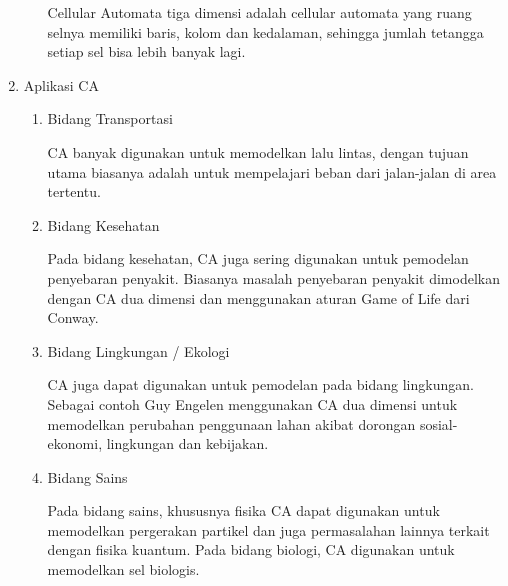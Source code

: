 \begin{enumerate}
\begin{enumerate}
			Cellular Automata tiga dimensi adalah cellular automata yang ruang selnya memiliki baris, kolom dan kedalaman, sehingga jumlah tetangga setiap sel bisa lebih banyak lagi.
		\end{enumerate}
		
	\item Aplikasi CA
		
		\begin{enumerate}
			\item Bidang Transportasi
			
			CA banyak digunakan untuk memodelkan lalu lintas, dengan tujuan utama biasanya adalah untuk mempelajari beban dari jalan-jalan di area tertentu.
			
			\item Bidang Kesehatan
			
			Pada bidang kesehatan, CA juga sering digunakan untuk pemodelan penyebaran penyakit. Biasanya masalah penyebaran penyakit dimodelkan dengan CA dua dimensi dan menggunakan aturan Game of Life dari Conway.
			
			\item Bidang Lingkungan / Ekologi
			
			CA juga dapat digunakan untuk pemodelan pada bidang lingkungan. Sebagai contoh Guy Engelen menggunakan CA dua dimensi untuk memodelkan perubahan penggunaan lahan akibat dorongan sosial-ekonomi, lingkungan dan kebijakan.
			
			\item Bidang Sains
			
			Pada bidang sains, khususnya fisika CA dapat digunakan untuk memodelkan pergerakan partikel dan juga permasalahan lainnya terkait dengan fisika kuantum. Pada bidang biologi, CA digunakan untuk memodelkan sel biologis.
		\end{enumerate}
		
\end{enumerate}



